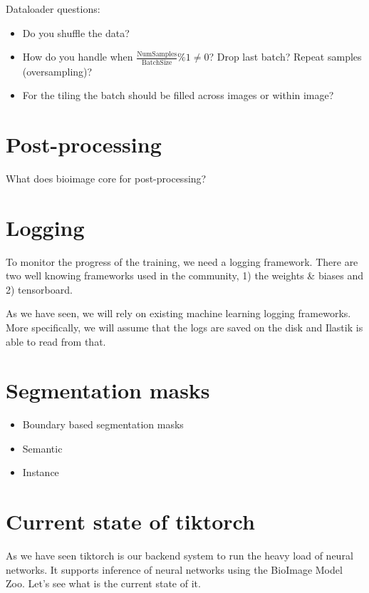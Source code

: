 \documentclass[12pt, a4paper]{article}
\begin{document}
Dataloader questions:
\begin{itemize}
    \itemsep -0.2em
    \item Do you shuffle the data?
    \item How do you handle when $\frac{\text{NumSamples}}{\text{BatchSize}} \% 1 \neq 0$? Drop last batch? Repeat samples (oversampling)?
    \item For the tiling the batch should be filled across images or within image?
\end{itemize}

\section{Post-processing}

What does bioimage core for post-processing?


\section{Logging}

To monitor the progress of the training, we need a logging framework. There are two well knowing frameworks used in the community, 1) the weights \& biases and 2) tensorboard.


As we have seen, we will rely on existing machine learning logging frameworks. More specifically, we will assume that the logs are saved on the disk and Ilastik is able to read from that.

\section{Segmentation masks}

\begin{itemize}
    \item Boundary based segmentation masks
    \item Semantic 
    \item Instance
\end{itemize}


\section{Current state of tiktorch}

As we have seen tiktorch is our backend system to run the heavy load of neural networks. It supports inference of neural networks using the  BioImage Model Zoo. Let's see what is the current state of it.
\end{document}
